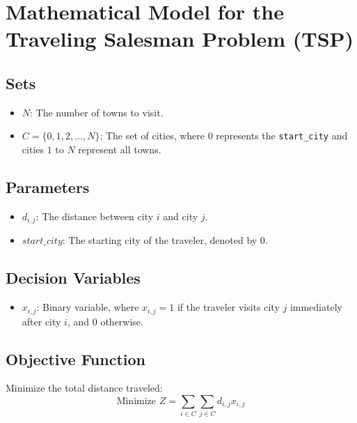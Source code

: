 \documentclass{article}
\begin{document}
\section*{Mathematical Model for the Traveling Salesman Problem (TSP)}

\subsection*{Sets}
\begin{itemize}
    \item $N$: The number of towns to visit.
    \item $C = \{0, 1, 2, \ldots, N\}$: The set of cities, where $0$ represents the \texttt{start\_city} and cities $1$ to $N$ represent all towns.
\end{itemize}

\subsection*{Parameters}
\begin{itemize}
    \item $d_{i,j}$: The distance between city $i$ and city $j$.
    \item $start\_city$: The starting city of the traveler, denoted by $0$.
\end{itemize}

\subsection*{Decision Variables}
\begin{itemize}
    \item $x_{i,j}$: Binary variable, where $x_{i,j} = 1$ if the traveler visits city $j$ immediately after city $i$, and $0$ otherwise.
    \end{itemize}

\subsection*{Objective Function}
Minimize the total distance traveled:
\[
\text{Minimize } Z = \sum_{i \in C} \sum_{j \in C} d_{i,j} x_{i,j}
\]
\end{document}
